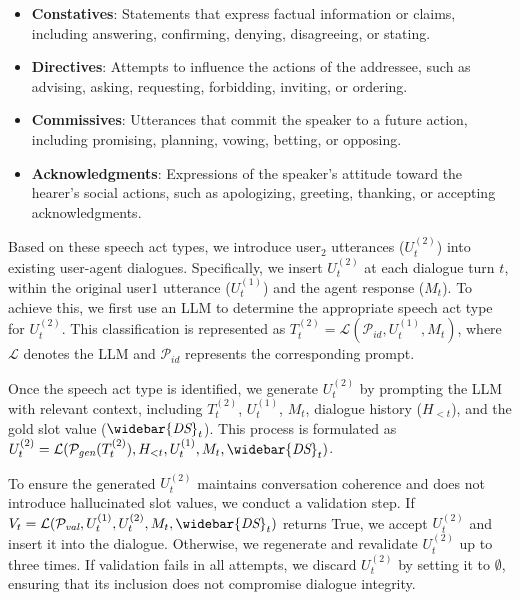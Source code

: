 \documentclass[11pt]{article}
\begin{document}
\begin{itemize}
    \item \textbf{Constatives}: Statements that express factual information or claims, including answering, confirming, denying, disagreeing, or stating.
    \item \textbf{Directives}: Attempts to influence the actions of the addressee, such as advising, asking, requesting, forbidding, inviting, or ordering.
    \item \textbf{Commissives}: Utterances that commit the speaker to a future action, including promising, planning, vowing, betting, or opposing.
    \item \textbf{Acknowledgments}: Expressions of the speaker’s attitude toward the hearer’s social actions, such as apologizing, greeting, thanking, or accepting acknowledgments.
\end{itemize}

Based on these speech act types, we introduce user$_2$ utterances ($U^{(2)}_{t}$) into existing user-agent dialogues. Specifically, we insert $U^{(2)}_{t}$ at each dialogue turn $t$, within the original user$1$ utterance ($U^{(1)}_{t}$) and the agent response ($M_{t}$). To achieve this, we first use an LLM to determine the appropriate speech act type for $U^{(2)}_{t}$. This classification is represented as $T^{(2)}_t=\mathcal{L}(\mathcal{P}_{\textit{id}}, U^{(1)}_{t}, M_{t})$, where $\mathcal{L}$ denotes the LLM and $\mathcal{P}_{\textit{id}}$ represents the corresponding prompt.

Once the speech act type is identified, we generate $U^{(2)}_{t}$ by prompting the LLM with relevant context, including $T^{(2)}_t$, $U^{(1)}_{t}$, $M_{t}$, dialogue history ($H_{<t}$), and the gold slot value ($\widebar{\textit{DS}}_t$). This process is formulated as $U^{(2)}_{t} = \mathcal{L}(\mathcal{P}_{\textit{gen}}(T^{(2)}_t), H_{<t}, U^{(1)}_{t}, M_{t}, \widebar{\textit{DS}}_t)$.

To ensure the generated $U^{(2)}_{t}$ maintains conversation coherence and does not introduce hallucinated slot values, we conduct a validation step. If $V_t = \mathcal{L}(\mathcal{P}_{\textit{val}}, U^{(1)}_{t}, U^{(2)}_{t}, M_{t}, \widebar{\textit{DS}}_t)$ returns True, we accept $U^{(2)}_{t}$ and insert it into the dialogue. Otherwise, we regenerate and revalidate $U^{(2)}_{t}$ up to three times. If validation fails in all attempts, we discard $U^{(2)}_{t}$ by setting it to $\emptyset$, ensuring that its inclusion does not compromise dialogue integrity.
\end{document}
